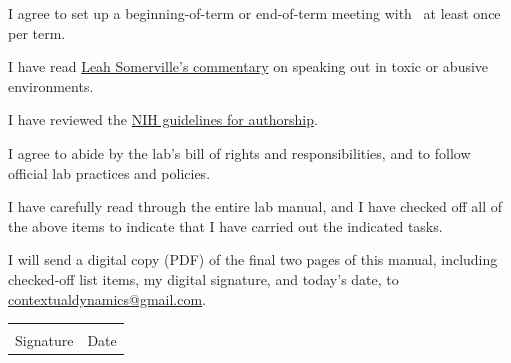 \documentclass{tufte-book} %
\begin{document}
\begin{todolist}
  \item I agree to set up a beginning-of-term or end-of-term meeting
    with \director~at least once per term.
  \item I have read \href{https://www.sciencemag.org/careers/2018/11/what-can-we-learn-dartmouth}{Leah Somerville's commentary} on speaking
    out in toxic or abusive environments.
  \item I have reviewed the
    \href{https://oir.nih.gov/sites/default/files/uploads/sourcebook/documents/ethical_conduct/guidelines-authorship_contributions.pdf}{NIH
      guidelines for authorship}.
  \item I agree to abide by the lab's bill of rights and
    responsibilities, and to follow official lab practices and
    policies.
  \item I have carefully read through the entire lab manual, and I have
    checked off all of the above items to indicate that I have carried
    out the indicated tasks.
  \item I will send a digital copy (PDF) of the final two pages of
    this manual, including checked-off list items, my digital
    signature, and today's date, to \href{mailto:contextualdynamics@gmail.com}{contextualdynamics@gmail.com}.
\end{todolist}

\vspace{1in}
\begin{tabular}{@{}p{3in}p{1in}@{}}
\hrulefill & \hrulefill \\
Signature & Date\\
\end{tabular}





\end{document}
